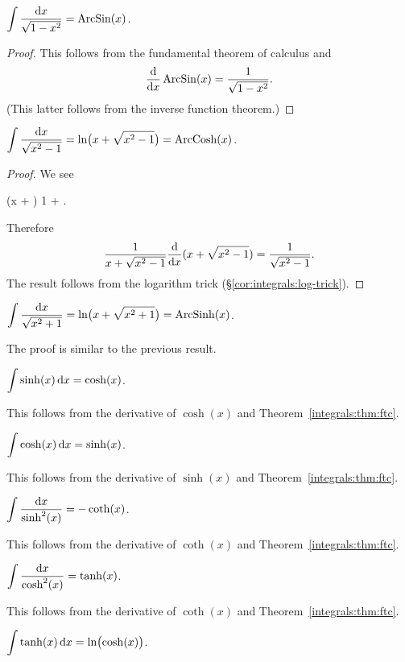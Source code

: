 \M $\displaystyle{\int\frac{\mathrm{d}x}{\sqrt{1 - x^{2}}} = \operatorname{ArcSin}(x)}$.

\begin{proof}
This follows from the fundamental theorem of calculus and
\begin{equation}
\frac{\mathrm{d}}{\mathrm{d} x}\operatorname{ArcSin}(x) = \frac{1}{\sqrt{1 - x^{2}}}.
\end{equation}
(This latter follows from the inverse function theorem.)
\end{proof}

\M $\displaystyle{\int\frac{\mathrm{d}x}{\sqrt{x^{2} - 1}} = \ln\bigl(x + \sqrt{x^{2}-1}\bigr)=\operatorname{ArcCosh}(x)}$.

\begin{proof}
We see
\begin{calculation}
  (x + )
  1 + 
  .
\end{calculation}
Therefore
\begin{equation}
\frac{1}{x + \sqrt{x^{2} - 1}}\frac{\mathrm{d}}{\mathrm{d} x}(x + \sqrt{x^{2} - 1})
= \frac{1}{\sqrt{x^{2} - 1}}.
\end{equation}
The result follows from the logarithm trick (\S\ref{cor:integrals:log-trick}).
\end{proof}

\M $\displaystyle{\int\frac{\mathrm{d}x}{\sqrt{x^{2} + 1}} = \ln\bigl(x + \sqrt{x^{2}+1}\bigr)=\operatorname{ArcSinh}(x)}$.

The proof is similar to the previous result.

\M $\displaystyle{\int\sinh(x)\,\mathrm{d}x = \cosh(x)}$.

This follows from the derivative of $\cosh(x)$ and Theorem~\ref{integrals:thm:ftc}.

\M $\displaystyle{\int\cosh(x)\,\mathrm{d}x = \sinh(x)}$.

This follows from the derivative of $\sinh(x)$ and Theorem~\ref{integrals:thm:ftc}.

\M $\displaystyle{\int\frac{\mathrm{d}x}{\sinh^{2}(x)} = -\coth(x)}$.

This follows from the derivative of $\coth(x)$ and Theorem~\ref{integrals:thm:ftc}.

\M $\displaystyle{\int\frac{\mathrm{d}x}{\cosh^{2}(x)} = \tanh(x)}$.

This follows from the derivative of $\coth(x)$ and Theorem~\ref{integrals:thm:ftc}.

\M $\displaystyle{\int\tanh(x)\,\mathrm{d}x = \ln\bigl(\cosh(x)\bigr)}$.

